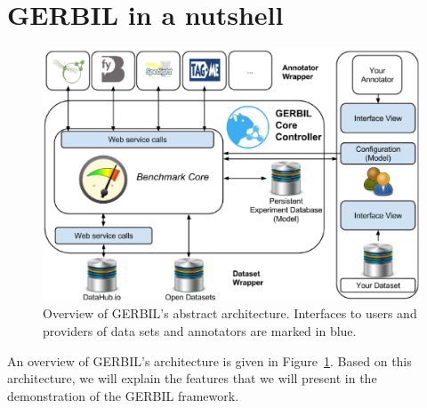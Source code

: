 \section{GERBIL in a nutshell}
\label{sec:architecture}
\begin{figure}[tb]
\centering
\includegraphics[width=0.7\linewidth]{chapter_three/benchmarking/ESWC_GERBIL_demo/gerbiloverview.eps}
\caption{Overview of GERBIL's abstract architecture. Interfaces to users and providers of data sets and annotators are marked in blue.
}
\label{fig:architecture}
\end{figure}

An overview of GERBIL's architecture is given in Figure~\ref{fig:architecture}. 
Based on this architecture, we will explain the features that we will present in the demonstration of the GERBIL framework.

